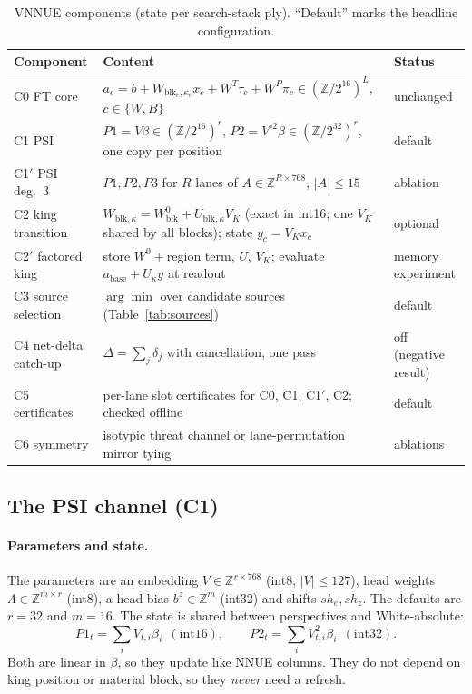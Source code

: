 \documentclass[10pt]{article}
\newcommand{\Z}{\mathbb{Z}}
\newcommand{\Zm}[1]{\Z/2^{#1}}
\theoremstyle{plain}
\theoremstyle{definition}
\begin{document}
\begin{table}[htbp]
\centering\small
\caption{VNNUE components (state per search-stack ply). ``Default'' marks the headline configuration.}\label{tab:components}
\begin{tabularx}{\linewidth}{@{}lXl@{}}
\toprule
Component & Content & Status\\
\midrule
C0 FT core & $a_c=b+W_{\mathrm{blk}_c,\kappa_c}x_c+W^T\tau_c+W^P\pi_c\in(\Zm{16})^L$, $c\in\{W,B\}$ & unchanged \\
C1 PSI & $P1=V\beta\in(\Zm{16})^r$, $P2=V^{\circ2}\beta\in(\Zm{32})^r$, one copy per position & default \\
C1$'$ PSI deg.~3 & $P1,P2,P3$ for $R$ lanes of $A\in\Z^{R\times768}$, $|A|\le15$ & ablation\\
C2 king transition & $W_{\mathrm{blk},\kappa}=W^0_{\mathrm{blk}}+U_{\mathrm{blk},\kappa}V_K$ (exact in int16; one $V_K$ shared by all blocks); state $y_c=V_Kx_c$ & optional\\
C2$'$ factored king & store $W^0+$region term, $U$, $V_K$; evaluate $a_{\text{base}}+U_\kappa y$ at readout & memory experiment\\
C3 source selection & $\arg\min$ over candidate sources (Table~\ref{tab:sources}) & default\\
C4 net-delta catch-up & $\Delta=\sum_j\delta_j$ with cancellation, one pass & off (negative result)\\
C5 certificates & per-lane slot certificates for C0, C1, C1$'$, C2; checked offline & default\\
C6 symmetry & isotypic threat channel or lane-permutation mirror tying & ablations\\
\bottomrule
\end{tabularx}
\end{table}

\subsection{The PSI channel (C1)}

\paragraph{Parameters and state.}
The parameters are an embedding $V\in\Z^{r\times768}$ (int8, $|V|\le127$), head weights $\Lambda\in\Z^{m\times r}$ (int8), a head bias $b^z\in\Z^m$ (int32) and shifts $\mathit{sh}_e,\mathit{sh}_z$.
The defaults are $r=32$ and $m=16$.
The state is shared between perspectives and White-absolute:
\[
P1_t=\sum_iV_{t,i}\beta_i\ \ (\text{int16}),\qquad P2_t=\sum_iV_{t,i}^2\beta_i\ \ (\text{int32}).
\]
Both are linear in $\beta$, so they update like NNUE columns.
They do not depend on king position or material block, so they \emph{never} need a refresh.
\end{document}
